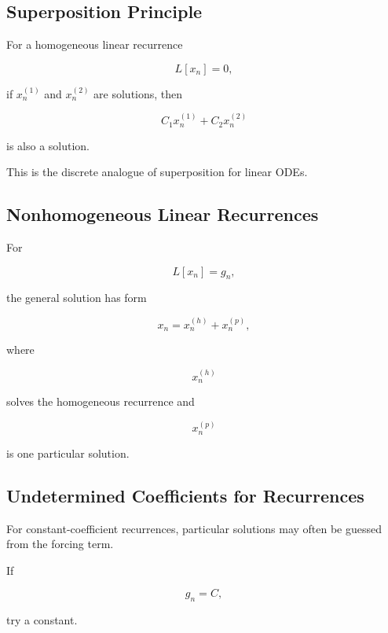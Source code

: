 \subsection{Superposition Principle}
\label{subsec:difference-superposition}

For a homogeneous linear recurrence

\[
L[x_n]=0,
\]

if \(x_n^{(1)}\) and \(x_n^{(2)}\) are solutions, then

\[
\boxed{
C_1x_n^{(1)}
+
C_2x_n^{(2)}
}
\]

is also a solution.

This is the discrete analogue of superposition for linear ODEs.

\subsection{Nonhomogeneous Linear Recurrences}
\label{subsec:nonhomogeneous-linear-recurrences}

For

\[
\boxed{
L[x_n]=g_n,
}
\]

the general solution has form

\[
\boxed{
x_n
=
x_n^{(h)}
+
x_n^{(p)},
}
\]

where

\[
x_n^{(h)}
\]

solves the homogeneous recurrence and

\[
x_n^{(p)}
\]

is one particular solution.

\subsection{Undetermined Coefficients for Recurrences}
\label{subsec:undetermined-coefficients-recurrences}

For constant-coefficient recurrences, particular solutions may often be
guessed from the forcing term.

If

\[
g_n=C,
\]

try a constant.

